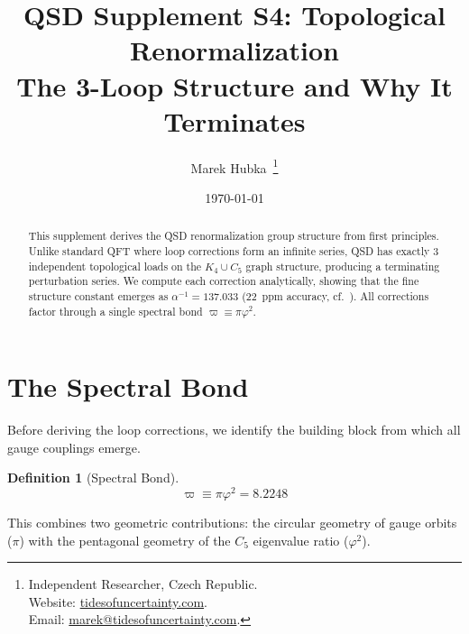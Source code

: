 \documentclass[11pt,a4paper]{article}
\title{
  \textbf{QSD Supplement S4: Topological Renormalization}\\[0.5em]
  \Large The 3-Loop Structure and Why It Terminates\\[1em]
}
\author{
  Marek Hubka\, \orcidlink{0009-0003-2476-9017}
  \thanks{
    Independent Researcher, Czech Republic.\\
    Website: \href{http://www.tidesofuncertainty.com}{tidesofuncertainty.com}.\\
    Email: \href{mailto:marek@tidesofuncertainty.com}{marek@tidesofuncertainty.com}.
  }
}
\date{\today}
\theoremstyle{definition}
\newtheorem{definition}[theorem]{Definition}
\begin{document}
\maketitle

\begin{abstract}
This supplement derives the QSD renormalization group structure from first principles. Unlike standard QFT where loop corrections form an infinite series, QSD has exactly 3 independent topological loads on the $K_4 \cup C_5$ graph structure, producing a terminating perturbation series. We compute each correction analytically, showing that the fine structure constant emerges as $\alpha^{-1} = 137.033$ (22~ppm accuracy, cf.\ \cite{PDG2022}). All corrections factor through a single spectral bond $\varpi \equiv \pi\varphi^2$.
\end{abstract}

\tableofcontents

\section{The Spectral Bond}
\label{sec:specbond}

Before deriving the loop corrections, we identify the building block from which all gauge couplings emerge.

\begin{definition}[Spectral Bond]
\begin{equation}
\varpi \equiv \pi\varphi^2 = 8.2248
\label{eq:specbond}
\end{equation}
\end{definition}

This combines two geometric contributions: the circular geometry of gauge orbits ($\pi$) with the pentagonal geometry of the $C_5$ eigenvalue ratio ($\varphi^2$).
\end{document}
